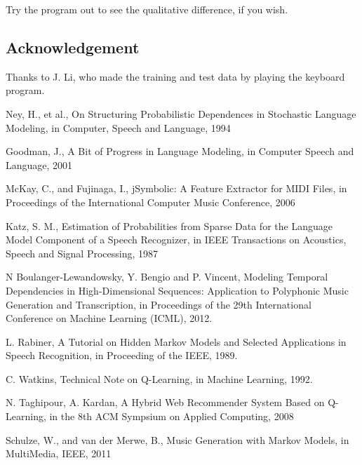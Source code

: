 \documentclass{article}
\begin{document}
Try the program out to see the qualitative difference, if you wish.

\subsection*{Acknowledgement}
Thanks to J. Li, who made the training and test data by playing the keyboard program.

\begin{thebibliography}{9}

Ney, H., et al., On Structuring Probabilistic Dependences in Stochastic Language Modeling, in Computer, Speech and Language, 1994

Goodman, J., A Bit of Progress in Language Modeling, in Computer Speech and Language, 2001

McKay, C., and Fujinaga, I., jSymbolic: A Feature Extractor for MIDI Files, in Proceedings of the International Computer Music Conference, 2006

Katz, S. M., Estimation of Probabilities from Sparse Data for the Language Model Component of a Speech Recognizer, in IEEE Transactions on Acoustics, Speech and Signal Processing, 1987

N Boulanger-Lewandowsky, Y. Bengio and P. Vincent, Modeling Temporal Dependencies in High-Dimensional Sequences: Application to Polyphonic Music Generation and Transcription, in Proceedings of the 29th International Conference on Machine Learning (ICML), 2012.

L. Rabiner, A Tutorial on Hidden Markov Models and Selected Applications in Speech Recognition, in Proceeding of the IEEE, 1989.

C. Watkins, Technical Note on Q-Learning, in Machine Learning, 1992.

N. Taghipour, A. Kardan, A Hybrid Web Recommender System Based on Q-Learning, in the 8th ACM Sympsium on Applied Computing, 2008

Schulze, W., and van der Merwe, B., Music Generation with Markov Models, in MultiMedia, IEEE, 2011

\end{thebibliography}
\end{document}
